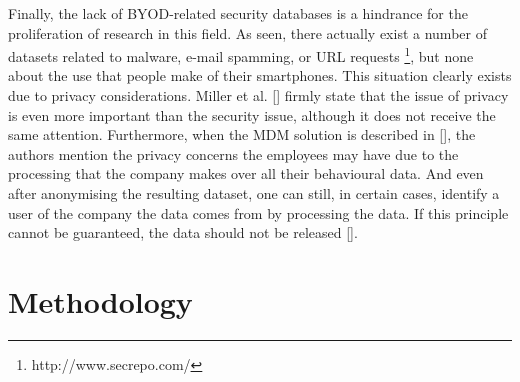 Finally, the lack of BYOD-related security databases is a hindrance for the
proliferation of research in this field. As seen, there actually exist
a number of datasets related to malware, e-mail spamming, or URL
requests \footnote{http://www.secrepo.com/}, but none about the use
that people make of their smartphones. This situation clearly exists
due to privacy considerations. Miller et al. [\cite{Miller201253}]
firmly state that the issue of privacy is even more important than the
security issue, although it does not receive the same
attention. Furthermore, when the MDM solution is described in
[\cite{ali2015analysis}], the authors mention the privacy concerns the
employees may have due to the processing that the company makes over
all their behavioural data. And even after anonymising the resulting
dataset, one can still, in certain cases, identify a user of the
company the data comes from by processing the data. If this principle
cannot be guaranteed, the data should not be released
[\cite{boillat2014handbook}].

\section{Methodology}
\label{sec:methodology}

